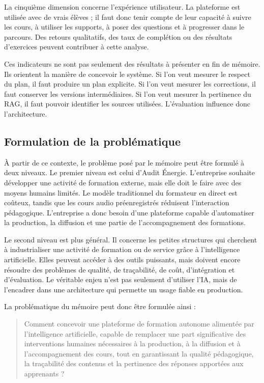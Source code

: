 La cinquième dimension concerne l'expérience utilisateur. La plateforme est utilisée avec
de vrais élèves ; il faut donc tenir compte de leur capacité à suivre les cours, à utiliser les
supports, à poser des questions et à progresser dans le parcours. Des retours qualitatifs,
des taux de complétion ou des résultats d'exercices peuvent contribuer à cette analyse.

Ces indicateurs ne sont pas seulement des résultats à présenter en fin de mémoire. Ils
orientent la manière de concevoir le système. Si l'on veut mesurer le respect du plan, il
faut produire un plan explicite. Si l'on veut mesurer les corrections, il faut conserver les
versions intermédiaires. Si l'on veut mesurer la pertinence du RAG, il faut pouvoir
identifier les sources utilisées. L'évaluation influence donc l'architecture.

\subsection{Formulation de la problématique}

À partir de ce contexte, le problème posé par le mémoire peut être formulé à deux
niveaux. Le premier niveau est celui d'Audit Énergie. L'entreprise souhaite développer
une activité de formation externe, mais elle doit le faire avec des moyens humains
limités. Le modèle traditionnel du formateur en direct est coûteux, tandis que les cours
audio préenregistrés réduisent l'interaction pédagogique. L'entreprise a donc besoin
d'une plateforme capable d'automatiser la production, la diffusion et une partie de
l'accompagnement des formations.

Le second niveau est plus général. Il concerne les petites structures qui cherchent à
industrialiser une activité de formation ou de service grâce à l'intelligence artificielle.
Elles peuvent accéder à des outils puissants, mais doivent encore résoudre des problèmes
de qualité, de traçabilité, de coût, d'intégration et d'évaluation. Le véritable enjeu n'est
pas seulement d'utiliser l'IA, mais de l'encadrer dans une architecture qui permette un
usage fiable en production.

La problématique du mémoire peut donc être formulée ainsi :

\begin{quote}
Comment concevoir une plateforme de formation autonome alimentée par
l'intelligence artificielle, capable de remplacer une part significative des interventions
humaines nécessaires à la production, à la diffusion et à l'accompagnement des cours,
tout en garantissant la qualité pédagogique, la traçabilité des contenus et la pertinence
des réponses apportées aux apprenants ?
\end{quote}

